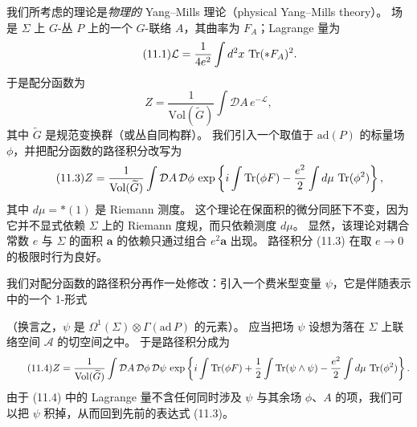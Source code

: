 我们所考虑的理论是\emph{物理的} Yang–Mills 理论（physical Yang–Mills theory）。
场是 $\Sigma$ 上 $G$-丛 $P$ 上的一个 $G$-联络 $A$，其曲率为 $F_A$；Lagrange 量为
\begin{equation}
  \tag{11.1}
  \label{eq:11-1}
  \mathcal{L}=\frac{1}{4e^{2}}\int d^{2}x\,\operatorname{Tr}(\ast F_{A})^{2}.
\end{equation}
于是配分函数为
\begin{equation}
  \tag{11.2}
  \label{eq:11-2}
  Z=\frac{1}{\mathrm{Vol}(\widetilde G)}\int \mathcal{D}A\,e^{-\mathcal{L}},
\end{equation}
其中 $\widetilde G$ 是规范变换群（或丛自同构群）。
我们引入一个取值于 $\mathrm{ad}(P)$ 的标量场 $\phi$，并把配分函数的路径积分改写为
\begin{equation}
  \tag{11.3}
  \label{eq:11-3}
  Z=\frac{1}{\mathrm{Vol}(\widetilde G)}\int \mathcal{D}A\,\mathcal{D}\phi\,
  \exp\left\{i\int \operatorname{Tr}(\phi F)-\frac{e^{2}}{2}\int d\mu\,\operatorname{Tr}(\phi^{2})\right\},
\end{equation}
其中 $d\mu=\ast(1)$ 是 Riemann 测度。
这个理论在保面积的微分同胚下不变，因为它并不显式依赖 $\Sigma$ 上的 Riemann 度规，而只依赖测度 $d\mu$。
显然，该理论对耦合常数 $e$ 与 $\Sigma$ 的面积 $\mathbf{a}$ 的依赖只通过组合 $e^{2}\mathbf{a}$ 出现。
路径积分 (11.3) 在取 $e\to0$ 的极限时行为良好。

我们对配分函数的路径积分再作一处修改：引入一个费米型变量 $\psi$，它是伴随表示中的一个 1-形式

{\let\thefootnote\relax{}}

（换言之，$\psi$ 是 $\Omega^{1}(\Sigma)\otimes\Gamma(\mathrm{ad}\,P)$ 的元素）。
应当把场 $\psi$ 设想为落在 $\Sigma$ 上联络空间 $\mathcal{A}$ 的切空间之中。
于是路径积分成为
\begin{equation}
  \tag{11.4}
  \label{eq:11-4}
  Z=\frac{1}{\mathrm{Vol}(\widetilde G)}\int \mathcal{D}A\,\mathcal{D}\phi\,\mathcal{D}\psi\,
  \exp\left\{i\int \operatorname{Tr}(\phi F)+\frac{1}{2}\int \operatorname{Tr}(\psi\wedge\psi)
  -\frac{e^{2}}{2}\int d\mu\,\operatorname{Tr}(\phi^{2})\right\}.
\end{equation}
由于 (11.4) 中的 Lagrange 量不含任何同时涉及 $\psi$ 与其余场 $\phi$、$A$ 的项，我们可以把 $\psi$ 积掉，从而回到先前的表达式 (11.3)。

